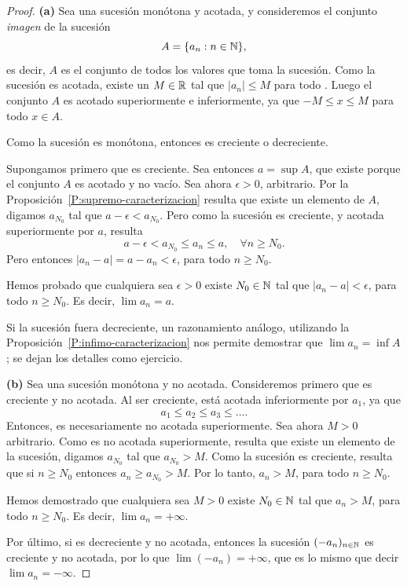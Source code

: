 \begin{proof}
    {\bf (a)}
    Sea \sucan una sucesión monótona y acotada, y consideremos el conjunto \emph{imagen} de la sucesión
    \[ A = \{ a_n : {n\in\mathbb{N}}\},
    \]
    es decir, $A$ es el conjunto de todos los valores que toma la sucesión. 
    Como la sucesión es acotada, existe un $M\in\mathbb{R}$ tal que $|a_n|\le M$ para todo \niN.
    Luego el conjunto $A$ es acotado superiormente e inferiormente, ya que $-M\le x\le M$ para todo $x\in A$.

    Como la sucesión es monótona, entonces es creciente o decreciente.

    Supongamos primero que \sucan es creciente. Sea entonces $a=\sup A$, que existe porque el conjunto $A$ es acotado y no vacío.
    Sea ahora $\epsilon > 0$, arbitrario.
    Por la Proposición~\ref{P:supremo-caracterizacion} resulta que existe un elemento de $A$, digamos $a_{N_0}$ tal que $a-\epsilon < a_{N_0}$. Pero como la sucesión es creciente, y acotada superiormente por $a$, resulta
    \[
    a-\epsilon < a_{N_0} \le a_n \le a,
    \quad \forall n\ge N_0.
    \]
    Pero entonces $|a_n-a| = a-a_n < \epsilon$, para todo $n\ge N_0$.

    Hemos probado que cualquiera sea $\epsilon > 0$ existe $N_0\in\mathbb{N}$ tal que  $|a_n-a| < \epsilon$, para todo $n\ge N_0$. Es decir, $\lim a_n = a$.

    Si la sucesión \sucan fuera decreciente, un razonamiento análogo, utilizando la Proposición~\ref{P:infimo-caracterizacion} nos permite demostrar que $\lim a_n = \inf A$; se dejan los detalles como ejercicio.

    {\bf (b)}
    Sea \sucan una sucesión monótona y no acotada. Consideremos primero que \sucan es creciente y no acotada. Al ser creciente, está acotada inferiormente por $a_1$, ya que 
    \[
    a_1 \le a_2 \le a_3 \le \dots.
    \]
    Entonces, es necesariamente no acotada superiormente. 
    Sea ahora $M>0$ arbitrario. Como \sucan es no acotada superiormente, resulta que existe un elemento de la sucesión, digamos $a_{N_0}$ tal que $a_{N_0}>M$. Como la sucesión es creciente, resulta que  si $n\ge N_0$ entonces $a_n\ge a_{N_0} > M$. Por lo tanto, $a_n > M$, para todo $n\ge N_0$. 

    Hemos demostrado que cualquiera sea $M>0$ existe $N_0 \in \mathbb{N}$ tal que $a_n > M$, para todo $n\ge N_0$. Es decir, $\lim a_n = +\infty$.

    Por último, si \sucan es decreciente y no acotada, entonces la sucesión $(-a_n)_{{n\in\mathbb{N}}}$ es creciente y no acotada, por lo que $\lim (-a_n) = +\infty$, que es lo mismo que decir $\lim a_n = -\infty$.
\end{proof}

